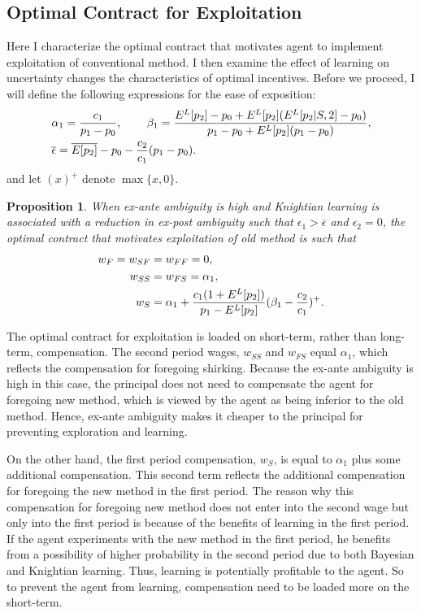 \documentclass[11pt]{article} %
\theoremstyle{exampstyle}
\newtheorem{proposition}{Proposition}
\newcommand{\eq}[1]{\begin{align}#1\end{align}}
\begin{document}
\subsection{Optimal Contract for Exploitation}

Here I characterize the optimal contract that motivates agent to implement exploitation of conventional method. I then examine the effect of learning on uncertainty changes the characteristics of optimal incentives. Before we proceed, I will define the following expressions for the ease of exposition:
\eq{
& \alpha_1 = \frac{c_1}{p_1-p_0}, \hspace{.3in} 
 \beta_1 = \frac{ E^L[p_2]- p_0 +  E^L[p_2](E^L[p_2 |S,2] - p_0) }{p_1-p_0 +  E^L[p_2](p_1-p_0) },		\notag \\
 & \overline{\epsilon} = \overline{E[p_2]} - p_0 - \frac{c_2}{c_1} (p_1 -p_0) \notag . 
}
and let $(x)^+$ denote $\max\{x,0\}$.
\vspace{.1in}
\begin{proposition}
\label{exploitation1}
When ex-ante ambiguity is high and Knightian learning is associated with a reduction in ex-post ambiguity such that $\epsilon_1 > \overline{\epsilon}$ and $\epsilon_2=0$, the optimal contract that motivates exploitation of old method is such that
%
\eq{ 
 w_F=w_{SF}&=w_{FF} =0 , \notag \\
 w_{SS}&=w_{FS}=\alpha_1,  \notag \\
 w_S &= \alpha_1 + \frac{c_1(1+E^L[p_2])}{p_1-E^L[p_2]}  (\beta_1 -\frac{c_2}{c_1})^+.		\notag 
}

\end{proposition}

The optimal contract for exploitation is loaded on short-term, rather than long-term, compensation. The second period wages, $w_{SS}$ and $w_{FS}$ equal $\alpha_1$, which reflects the compensation for foregoing shirking. Because the ex-ante ambiguity is high in this case, the principal does not need to compensate the agent for foregoing new method, which is viewed by the agent as being inferior to the old method. Hence, ex-ante ambiguity makes it cheaper to the principal for preventing exploration and learning. 

On the other hand, the first period compensation, $w_S$, is equal to $\alpha_1$ plus some additional compensation. This second term reflects the additional compensation for foregoing the new method in the first period. The reason why this compensation for foregoing new method does not enter into the second wage but only into the first period is because of the benefits of learning in the first period. If the agent experiments with the new method in the first period, he benefits from a possibility of higher probability in the second period due to both Bayesian and Knightian learning. Thus, learning is potentially profitable to the agent. So to prevent the agent from learning, compensation need to be loaded more on the short-term.
\end{document}
